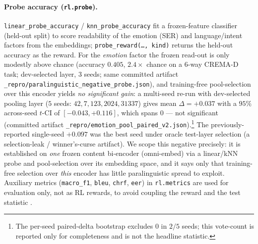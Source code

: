 \paragraph{Probe accuracy (\texttt{rl.probe}).}
\texttt{linear\_probe\_accuracy} / \texttt{knn\_probe\_accuracy} fit a frozen-feature classifier
(held-out split) to score readability of the emotion (SER) and language/intent factors from the
embeddings; \texttt{probe\_reward(\dots, kind)} returns the held-out accuracy as the reward. For the
\emph{emotion} factor the frozen read-out is only modestly above chance (accuracy $0.405$, $2.4\times$
chance on a $6$-way CREMA-D task; dev-selected layer, $3$ seeds; same committed artifact
\texttt{\_repro/paralinguistic\_negative\_probe.json}), and training-free pool-selection over this
encoder yields \emph{no significant gain}: a multi-seed re-run with dev-selected pooling layer
($5$ seeds: $42,7,123,2024,31337$) gives mean $\Delta=+0.037$ with a $95\%$ across-seed $t$-CI of
$[-0.043,+0.116]$, which spans $0$ --- not significant (committed artifact
\texttt{\_repro/emotion\_pool\_paired\_v2.json}).\footnote{The per-seed paired-delta bootstrap
excludes $0$ in $2/5$ seeds; this vote-count is reported only for completeness and is not the headline
statistic.} The previously-reported single-seed $+0.097$ was the best seed under oracle test-layer
selection (a selection-leak / winner's-curse artifact). We scope this negative precisely: it is
established on \emph{one} frozen content bi-encoder (omni-embed) via a linear/kNN probe and
pool-selection over its embedding space, and it says only that training-free selection over
\emph{this} encoder has little paralinguistic spread to exploit. Auxiliary metrics
(\texttt{macro\_f1}, \texttt{bleu}, \texttt{chrf}, \texttt{eer}) in \texttt{rl.metrics} are used for
evaluation only, not as RL rewards, to avoid coupling the reward and the test statistic
\citep{skalse2022rewardhacking}.




